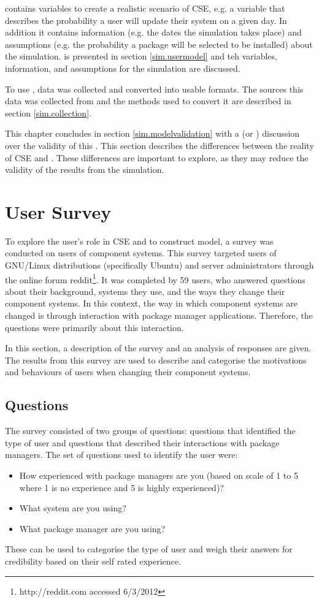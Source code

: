 \usermodel contains variables to create a realistic scenario of CSE, e.g. a variable that describes the probability a user will update their system on a given day.
In addition it contains information (e.g. the dates the simulation takes place) and assumptions (e.g. the probability a package will be selected to be installed) about the simulation.
\usermodel is presented in section \ref{sim.usermodel} and teh variables, information, and assumptions for the simulation are discussed.

To use \usermodel, data was collected and converted into usable formats.
The sources this data was collected from and the methods used to convert it are described in section \ref{sim.collection}.

This chapter concludes in section \ref{sim.modelvalidation} with a (or ) discussion over the validity of this \usermodel.
This section describes the differences between the reality of CSE and \usermodel.
These differences are important to explore, as they may reduce the validity of the results from the simulation.

\section{User Survey}
\label{strat.usersurvey}
To explore the user's role in CSE and to construct \usermodel model, a survey was conducted on users of component systems.
This survey targeted users of GNU/Linux distributions (specifically Ubuntu) and server administrators through the online forum reddit\footnote{http://reddit.com accessed 6/3/2012}.
It was completed by 59 users, who answered questions about their background, systems they use, and the ways they change their component systems.
In this context, the way in which component systems are changed is through interaction with package manager applications. 
Therefore, the questions were primarily about this interaction.

In this section, a description of the survey and an analysis of responses are given.
The results from this survey are used to describe and categorise the motivations and behaviours of users when changing their component systems.

\subsection{Questions}
The survey consisted of two groups of questions: questions that identified the type of user and questions that described their interactions with package managers.
The set of questions used to identify the user were:
\begin{itemize}
  \item How experienced with package managers are you (based on scale of 1 to 5 where 1 is no experience and 5 is highly experienced)? 
  \item What system are you using?
  \item What package manager are you using?
\end{itemize}
These can be used to categorise the type of user and weigh their answers for credibility based on their self rated experience.

